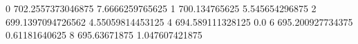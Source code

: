 0 702.2557373046875 7.6666259765625
1 700.134765625 5.545654296875
2 699.1397094726562 4.55059814453125
4 694.589111328125 0.0
6 695.200927734375 0.61181640625
8 695.63671875 1.047607421875
